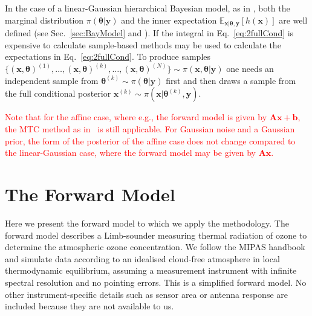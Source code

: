 \documentclass{article}
\begin{document}
In the case of a linear-Gaussian hierarchical Bayesian model, as in \cite{fox2016fast}, both the marginal distribution $\pi (\bm{\theta}| \bm{y})$ 
and the inner expectation $\mathbb{E}_{\bm{x} |  \bm{\theta}, \bm{y}} \left[ h(\bm{x}) \right]$ are well defined (see Sec.~\ref{sec:BayModel} and \cite{fox2016fast}).
If the integral in Eq.~\ref{eq:2fullCond} is expensive to calculate sample-based methods may be used to calculate the expectations in 
Eq.~\eqref{eq:2fullCond}.
To produce samples $\{ (\bm{x}, \bm{\theta})^{(1)}, \dots, (\bm{x}, \bm{\theta})^{(k)}, \dots, (\bm{x}, \bm{\theta})^{(N)} \} \sim \pi(\bm{x}, \bm{\theta} |  \bm{y}) $ one needs an independent sample from $\bm{\theta}^{(k)} \sim \pi(\bm{\theta} |  \bm{y})$ first and then draws a sample from the full conditional posterior $\bm{x}^{(k)} \sim \pi(\bm{x} | \bm{\theta}^{(k)}  , \bm{y})$.

\textcolor{red}{
Note that for the affine case, where e.g., the forward model is given by $\bm{A}\bm{x} + \bm{b}$, the MTC method as in~\cite{fox2016fast} is still applicable.
For Gaussian noise and a Gaussian prior, the form of the posterior of the affine case does not change compared to the linear-Gaussian case, where the forward model may be given by $\bm{A}\bm{x}$.}
\section{The Forward Model}
\label{ch:formodel}
Here we present the forward model to which we apply the methodology.
The forward model describes a Limb-sounder measuring thermal radiation of ozone to determine the atmospheric ozone concentration.
We follow the MIPAS handbook~\cite{mipas2000handbook} and simulate data according to an idealised cloud-free atmosphere in local thermodynamic equilibrium, assuming a measurement instrument with infinite spectral resolution and no pointing errors.
This is a simplified forward model.
No other instrument-specific details such as sensor area or antenna response are included because they are not available to us. 
\end{document}
